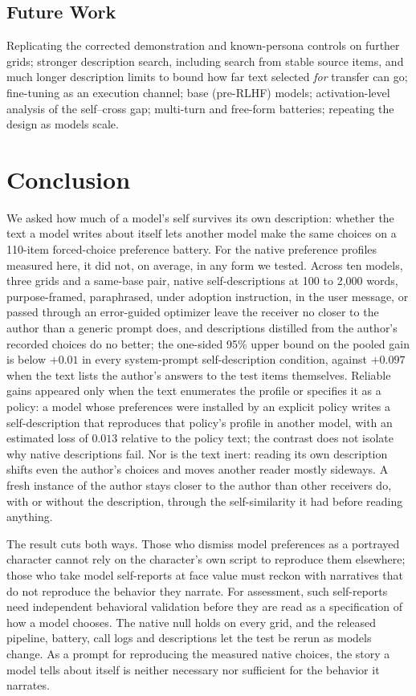 \documentclass[11pt]{article}
\begin{document}
\subsection*{Future Work}
Replicating the corrected demonstration and known-persona controls on
further grids; stronger description search, including search from stable
source items, and much longer description
limits to bound how far text selected \emph{for} transfer can go;
fine-tuning as an execution channel; base (pre-RLHF) models;
activation-level analysis of the self--cross gap; multi-turn and free-form
batteries; repeating the design as models scale.

\section{Conclusion}
We asked how much of a model's self survives its own description: whether
the text a model writes about itself lets another model make the same
choices on a 110-item forced-choice preference battery. For the native
preference profiles measured here, it did not, on average, in any form we
tested. Across ten models, three grids and a same-base pair, native
self-descriptions at 100 to 2{,}000 words, purpose-framed, paraphrased,
under adoption instruction, in the user message, or passed through an
error-guided optimizer leave the receiver no closer to the author than a
generic prompt does, and descriptions distilled from the author's recorded
choices do no better; the one-sided 95\% upper bound on the pooled gain is
below $+0.01$ in every system-prompt self-description condition, against
$+0.097$ when the text lists the author's answers to the test items
themselves. Reliable gains appeared only when the text enumerates the
profile or specifies it as a policy: a model whose preferences were
installed by an explicit policy writes a self-description that reproduces
that policy's profile in another model, with an estimated loss of $0.013$
relative to the policy text; the contrast does not isolate why native
descriptions fail. Nor is the text inert: reading its own description
shifts even the author's choices and moves another reader mostly sideways.
A fresh instance of the author stays closer to the author than other
receivers do, with or without the description, through the self-similarity
it had before reading anything.

The result cuts both ways. Those who dismiss model preferences as a
portrayed character cannot rely on the character's own script to reproduce
them elsewhere; those who take model self-reports at face value must reckon
with narratives that do not reproduce the behavior they narrate. For
assessment, such self-reports need independent behavioral validation before
they are read as a specification of how a model chooses. The native null
holds on every grid, and the released pipeline, battery, call logs and
descriptions let the test be rerun as models change. As a prompt for
reproducing the measured native choices, the
story a model tells about itself is neither necessary nor sufficient for the
behavior it narrates.
\end{document}
